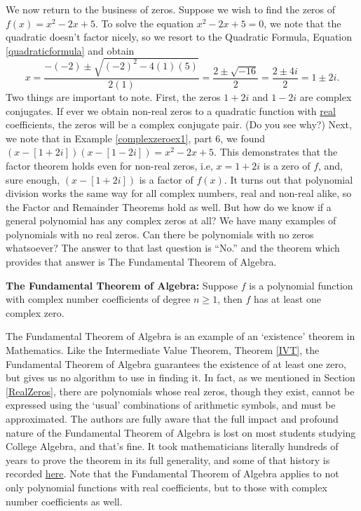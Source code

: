 \medskip

We now return to the business of zeros.  Suppose we wish to find the zeros of $f(x) = x^2-2x+5$.  To solve the equation $x^2-2x+5 = 0$, we note that the quadratic doesn't factor nicely, so we resort to the Quadratic Formula, Equation \ref{quadraticformula} and obtain \[ x = \dfrac{-(-2) \pm \sqrt{(-2)^2-4(1)(5)}}{2(1)} = \dfrac{2 \pm \sqrt{-16}}{2} = \dfrac{2 \pm 4i}{2} = 1 \pm 2i.\] Two things are important to note.  First, the zeros $1+2i$ and $1-2i$ are complex conjugates.  If ever we obtain non-real zeros to a quadratic function with \underline{real} coefficients, the zeros  will be a complex conjugate pair. (Do you see why?)  Next, we note that in Example \ref{complexzeroex1}, part 6, we found $(x-[1+2i])(x-[1-2i])=x^2-2x+5$.  This demonstrates that the factor theorem holds even for non-real zeros, i.e,  $x=1+2i$ is a zero of $f$, and, sure enough, $(x-[1+2i])$ is a factor of $f(x)$.  It turns out that polynomial division works the same way for all complex numbers, real and non-real alike, so the Factor and Remainder Theorems hold as well.  But how do we know if a general polynomial has any complex zeros at all?  We have many examples of polynomials with no real zeros.  Can there be polynomials with no zeros whatsoever?  The answer to that last question is ``No.'' and the theorem which provides that answer is  The Fundamental Theorem of Algebra.

\medskip

\colorbox{ResultColor}{\bbm
\begin{thm} \label{ftoa} \textbf{The Fundamental Theorem of Algebra:}  Suppose $f$ is a polynomial function with complex number coefficients of degree $n \geq 1$, then $f$ has at least one complex zero.

\end{thm}
\ebm}

\medskip

The Fundamental Theorem of Algebra is an example of an `existence' theorem in Mathematics.  Like the Intermediate Value Theorem, Theorem \ref{IVT}, the Fundamental Theorem of Algebra  guarantees the existence of at least one zero, but gives us no algorithm to use in finding it.  In fact, as we mentioned in Section \ref{RealZeros}, there are polynomials whose real zeros, though they exist, cannot be expressed using the `usual' combinations of arithmetic symbols, and must be approximated.  The authors are fully aware that the full impact and profound nature of the Fundamental Theorem of Algebra  is lost on most students studying College Algebra, and that's fine.  It took mathematicians literally hundreds of years to prove the theorem in its full generality, and some of that history is recorded \href{http://en.wikipedia.org/wiki/Fundamental_theorem_of_algebra}{\underline{here}}.  Note that the Fundamental Theorem of Algebra  applies to not only polynomial functions with real coefficients, but to those with complex number coefficients as well.  

